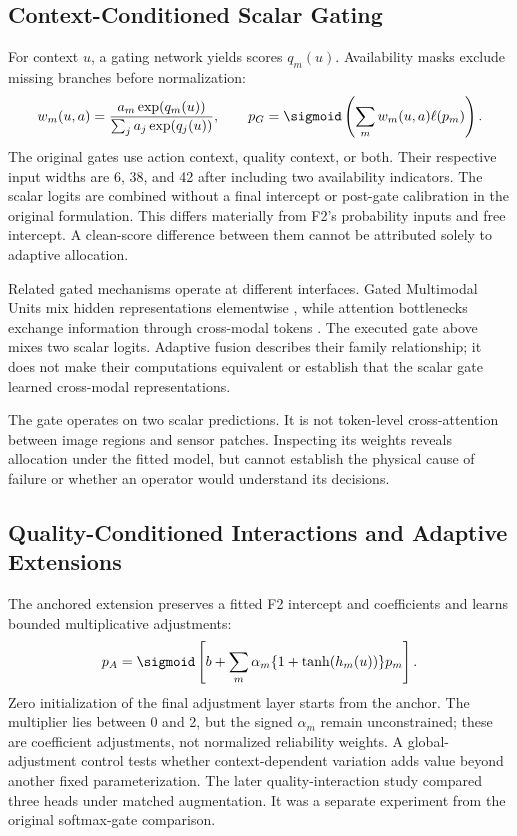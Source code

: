 \subsection{Context-Conditioned Scalar Gating}
For context $u$, a gating network yields scores $q_m(u)$. Availability masks exclude missing branches before normalization:
\begin{equation}
 w_m(u,a)=\frac{a_m\exp(q_m(u))}{\sum_j a_j\exp(q_j(u))},\qquad
 p_G=\sigmoid\left(\sum_m w_m(u,a)\ell(p_m)\right).
 \label{eq:gate}
\end{equation}
The original gates use action context, quality context, or both. Their respective input widths are 6, 38, and 42 after including two availability indicators. The scalar logits are combined without a final intercept or post-gate calibration in the original formulation. This differs materially from F2's probability inputs and free intercept. A clean-score difference between them cannot be attributed solely to adaptive allocation.

Related gated mechanisms operate at different interfaces. Gated Multimodal Units mix hidden representations elementwise \citep{P006}, while attention bottlenecks exchange information through cross-modal tokens \citep{Nagrani2021MBT}. The executed gate above mixes two scalar logits. Adaptive fusion describes their family relationship; it does not make their computations equivalent or establish that the scalar gate learned cross-modal representations.

The gate operates on two scalar predictions. It is not token-level cross-attention between image regions and sensor patches. Inspecting its weights reveals allocation under the fitted model, but cannot establish the physical cause of failure or whether an operator would understand its decisions.

\subsection{Quality-Conditioned Interactions and Adaptive Extensions}
The anchored extension preserves a fitted F2 intercept and coefficients and learns bounded multiplicative adjustments:
\begin{equation}
 p_A=\sigmoid\left[b+\sum_m\alpha_m\{1+\tanh(h_m(u))\}p_m\right].
 \label{eq:anchored}
\end{equation}
Zero initialization of the final adjustment layer starts from the anchor. The multiplier lies between 0 and 2, but the signed $\alpha_m$ remain unconstrained; these are coefficient adjustments, not normalized reliability weights. A global-adjustment control tests whether context-dependent variation adds value beyond another fixed parameterization. The later quality-interaction study compared three heads under matched augmentation. It was a separate experiment from the original softmax-gate comparison.


